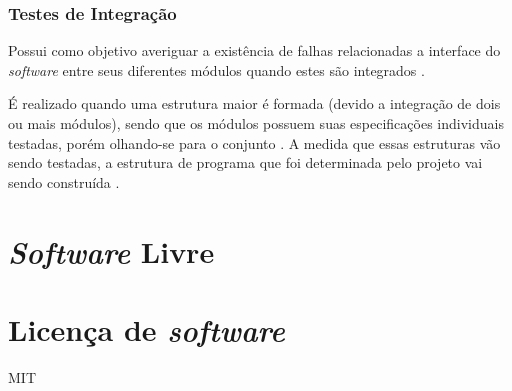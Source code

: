         \subsubsection{Testes de Integração}
        Possui como objetivo averiguar a existência de falhas relacionadas a interface do \textit{software} entre seus diferentes módulos quando estes são integrados \cite{artigo_intro_teste}.

        É realizado quando uma estrutura maior é formada (devido a integração de dois ou mais módulos), sendo que os módulos possuem suas especificações individuais testadas, porém olhando-se para o conjunto \cite{sw_test_tech}. A medida que essas estruturas vão sendo testadas, a estrutura de programa que foi determinada pelo projeto vai sendo construída \cite{maldonado}.

\section{\textit{Software} Livre}

\section{Licença de \textit{software}}
MIT